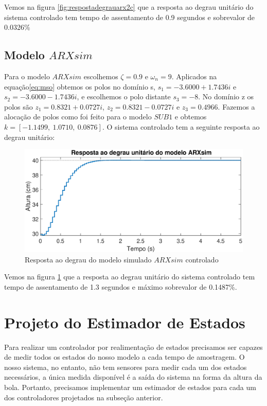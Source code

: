 Vemos na figura \ref{fig:respostadegrauarx2c} que a resposta ao degrau unitário do sistema controlado tem tempo de assentamento de 0.9 segundos e sobrevalor de 0.0326\%


\subsection{Modelo $ARXsim$}

Para o modelo $ARXsim$ escolhemos $\zeta=0.9$ e $\omega_n=9$. Aplicados na equação\eqref{eq:mso} obtemos os polos no domínio s, $s_1=-3.6000 + 1.7436i$ e $s_2=-3.6000 - 1.7436i$, e escolhemos o polo distante $s_3=-8$. No domínio z os polos são $z_1=0.8321 + 0.0727i$, $z_2=0.8321 - 0.0727i$ e $z_3=0.4966$. Fazemos a alocação de polos como foi feito para o modelo $SUB1$ e obtemos $k=[-1.1499,~1.0710,~0.0876]$.
O sistema controlado tem a seguinte resposta ao degrau unitário:

\begin{figure}[H]
	\centering
	\includegraphics[width=1\linewidth]{respostadegrauarxsimc}
	\caption[Resposta ao degrau do modelo simulado $ARXsim$]{Resposta ao degrau do modelo simulado $ARXsim$ controlado}
	\label{fig:respostadegrauarxsimc}
\end{figure}

Vemos na figura \ref{fig:respostadegrauarxsimc} que a resposta ao degrau unitário do sistema controlado tem tempo de assentamento de 1.3 segundos e máximo sobrevalor de 0.1487\%.


\section{Projeto do Estimador de Estados}
Para realizar um controlador por realimentação de estados precisamos ser capazes de medir todos os estados do nosso modelo a cada tempo de amostragem. O nosso sistema, no entanto, não tem sensores para medir cada um dos estados necessários, a única medida disponível é a saída do sistema na forma da altura da bola. Portanto, precisamos implementar um estimador de estados para cada um dos controladores projetados na subseção anterior.

